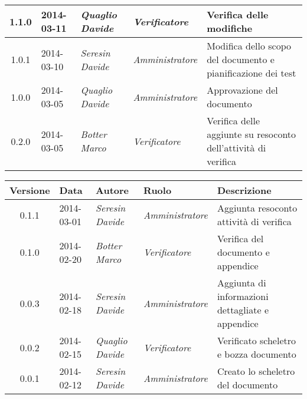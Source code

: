 \begin{small}
\begin{tabular}{|c|p{1.8cm}|p{2.8cm}|p{2.8cm}|p{3.5cm}|}
\hline
1.1.0 & 2014-03-11 & 
\textit{Quaglio Davide} &
\textit{Verificatore} &  Verifica delle modifiche\\
\hline
1.0.1 & 2014-03-10 & 
\textit{Seresin Davide} &
\textit{Amministratore} &  Modifica dello scopo del documento e pianificazione dei test\\
\hline
1.0.0 & 2014-03-05 & 
\textit{Quaglio Davide} &
\textit{Amministratore} &  Approvazione del documento\\
\hline
0.2.0 & 2014-03-05 & 
\textit{Botter Marco} &
\textit{Verificatore} &  Verifica delle aggiunte su resoconto dell'attività di verifica\\
\hline
\end{tabular}


\begin{tabular}{|c|p{1.8cm}|p{2.8cm}|p{2.8cm}|p{3.5cm}|}
\hline
Versione & Data & Autore & Ruolo & Descrizione \\
\hline
\hline
0.1.1 & 2014-03-01 & 
\textit{Seresin Davide} &
\textit{Amministratore} &  Aggiunta resoconto attività di verifica\\
\hline
0.1.0 & 2014-02-20 & 
\textit{Botter Marco} &
\textit{Verificatore} &  Verifica del documento e appendice\\
\hline
0.0.3 & 2014-02-18 & 
\textit{Seresin Davide} &
\textit{Amministratore} &  Aggiunta di informazioni dettagliate e appendice\\
\hline
0.0.2 & 2014-02-15 & 
\textit{Quaglio Davide} &
\textit{Verificatore} &  Verificato scheletro e bozza documento\\
\hline
0.0.1 & 2014-02-12 & 
\textit{Seresin Davide} &
\textit{Amministratore} &  Creato lo scheletro del documento\\
\hline
\end{tabular}\\
\end{small}